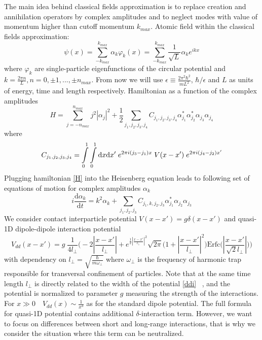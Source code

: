 \documentclass[aps,pra,reprint]{revtex4-2}
\begin{document}
    The main idea behind classical fields approximation is to replace creation and annihilation operators by complex amplitudes and to neglect modes with value of momentum higher than cutoff momentum $k_{max}$. Atomic field within the classical fields approximation:
    \begin{equation}
        \psi (x) = \sum _{-k_{max}} ^{k_{max}} \alpha  _k \varphi _k (x)=\sum _{-k_{max}} ^{k_{max}}  \frac{1}{\sqrt{L}} \alpha _k e^{ikx}
    \end{equation}
    where $\varphi _k$ are single-particle eigenfunctions of the circular potential and $k=\frac{2 \pi n}{L}, n=0,\pm 1,... , \pm n_{max}$. From now we will use $\epsilon \equiv \frac{2 \pi ^2 \hbar ^2}{m L^2}$, $\hbar/ \epsilon$ and $L$ as units of energy, time and length respectively. Hamiltonian as a function of the complex amplitudes
    \begin{equation}
    \label{Halpha}
        H=\sum_{j=-n_{max}}^{n_{max}}j^2|\alpha _j|^2+\frac{1}{2} \sum_{j_1,j_2,j_3,j_4}C_{j_1,j_2,j_3,j_4} \alpha^*_{j_1}\alpha^*_{j_2}\alpha_{j_3}\alpha_{j_4}
    \end{equation}
    where
    \begin{equation}
        C_{j_1,j_2,j_3,j_4}=\int\displaylimits_0^{1}\int\displaylimits_0^{1}\mathrm{d}x \mathrm{d}x' \; e^{2 \pi i (j_3-j_1)x} \;V(x-x') \; e^{2 \pi i (j_4-j_2)x'}
    \end{equation}
    Plugging hamiltonian \ref{H} into the Heisenberg equation leads to following set of equations of motion for complex amplitudes $\alpha _k$
    \begin{equation}\label{eqs}
        i \frac{\mathrm{d} \alpha_k}{\mathrm{d} t}=k^2 \alpha_k +\sum_{j_1,j_2,j_3}C_{j_1,k,j_2,j_3}\alpha^*_{j_1}\alpha_{j_2}\alpha_{j_3}
    \end{equation}
    We consider contact interparticle potential $V(x-x')=g \delta (x-x')$ and quasi-1D dipole-dipole interaction potential 
    \begin{equation}
    \label{ddi}
        V_{dd}(x-x')=g \; \frac{1}{4l_{\perp}}\Big(-2|\frac{x-x'}{l_{\perp}}|+e^{\frac{1}{2}|\frac{x-x'}{l_{\perp}}|^2}\sqrt{2 \pi}\big(1+|\frac{x-x'}{l_{\perp}}|^2\big)\text{Erfc}\big(|\frac{x-x'}{\sqrt{2}l_{\perp}}|\big)\Big)
    \end{equation}
     with dependency on $l_{\perp}=\sqrt{\frac{\hbar}{m \omega _{\perp}}}$ where $\omega _{\perp}$ is the frequency of harmonic trap responsible for transversal confinement of particles. Note that at the same time length $l_{\perp}$ is directly related to the width of the potential \ref{ddi} ~\cite{deuretzbacher2010ground}, and the potential is normalized to parameter $g$ measuring the strength of the interactions. For $x \gg 0  \quad V_{dd}(x) \sim \frac{1}{x^3}$ as for the standard dipole potential. The full formula for quasi-1D potential contains additional $\delta$-interaction term. However, we want to focus on differences between short and long-range interactions, that is why we consider the situation where this term can be neutralized. 
\end{document}
